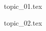 \documentclass[a4paper,12pt, openany]{book}
\begin{document}
    \maketitle

    {topic_01.tex}

    {topic_02.tex}
\end{document}
